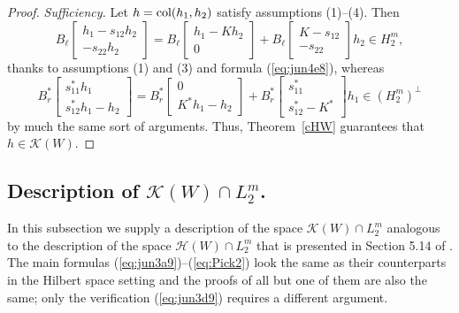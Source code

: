 \documentclass[12pt,twoside,a4paper]{amsart}
\theoremstyle{definition}
\numberwithin{equation}{section}
\begin{document}
\begin{proof}
{\it Sufficiency.}
Let $h=\textup{col}(h_1,h_2)$ satisfy assumptions (1)--(4). Then
\[
    B_{\ell}\left[\begin{array}{cc}
  h_1-s_{12}h_2 \\
  -s_{22}h_2
\end{array}  \right]= B_{\ell}\left[\begin{array}{cc}
  h_1-Kh_2 \\
  0
\end{array}  \right]+  B_{\ell}\left[\begin{array}{cc}
  K-s_{12} \\
   -s_{22}
\end{array}  \right]h_2\in H_2^m,
\]
thanks to assumptions (1) and (3) and formula (\ref{eq:jun4e8}), whereas
\[
B_r^*\left[\begin{array}{cc}
  s_{11}^*h_1\\
  s_{12}^*h_1-h_2
\end{array}  \right]=B_r^*\left[\begin{array}{cc}
   0 \\
  K^*h_1-h_2
\end{array}  \right]+B_r^*\left[\begin{array}{c}
  s_{11}^* \\
  s_{12}^*-K^*
\end{array}  \right]h_1\in (H_2^m)^\perp
\]
by much the same sort of arguments. Thus, Theorem~\ref{cHW}
guarantees that $h\in{{\mathcal K}}(W)$.
\end{proof}

\subsection{Description of ${{\mathcal K}}(W)\cap L_2^m$.} In this subsection we supply a
description of the space ${{\mathcal K}}(W)\cap L_2^m$ analogous to the
description of the space ${{\mathcal H}}(W)\cap L_2^m$ that is presented in Section
5.14 of \cite{ArovD08}. The main formulas
(\ref{eq:jun3a9})--(\ref{eq:Pick2}) look the same as their
counterparts in the Hilbert space setting and the proofs of all but one of
them are also the same; only the verification (\ref{eq:jun3d9})
requires a different argument.
\end{document}
